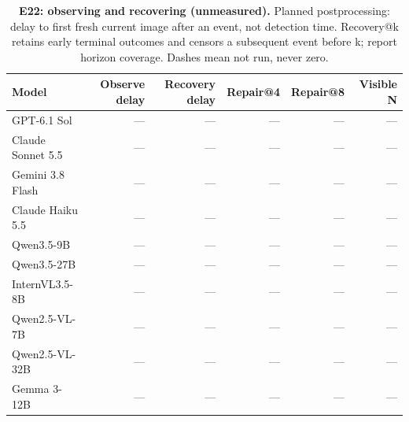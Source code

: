 \begin{table}[!ht]
\centering\small
\caption{\textbf{E22: observing and recovering (unmeasured).} Planned postprocessing: delay to first fresh current image after an event, not detection time. Recovery@k retains early terminal outcomes and censors a subsequent event before k; report horizon coverage. Dashes mean not run, never zero.}
\begin{tabularx}{\textwidth}{@{}Xrrrrr@{}}\toprule
Model & Observe delay & Recovery delay & Repair@4 & Repair@8 & Visible N\\\midrule
GPT-6.1 Sol & --- & --- & --- & --- & ---\\
Claude Sonnet 5.5 & --- & --- & --- & --- & ---\\
Gemini 3.8 Flash & --- & --- & --- & --- & ---\\
Claude Haiku 5.5 & --- & --- & --- & --- & ---\\
Qwen3.5-9B & --- & --- & --- & --- & ---\\
Qwen3.5-27B & --- & --- & --- & --- & ---\\
InternVL3.5-8B & --- & --- & --- & --- & ---\\
Qwen2.5-VL-7B & --- & --- & --- & --- & ---\\
Qwen2.5-VL-32B & --- & --- & --- & --- & ---\\
Gemma 3-12B & --- & --- & --- & --- & ---\\
\bottomrule
\end{tabularx}
\end{table}
